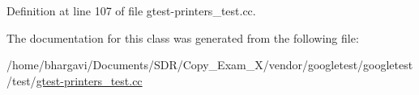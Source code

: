 Definition at line 107 of file gtest-\/printers\+\_\+test.\+cc.



The documentation for this class was generated from the following file\+:\begin{DoxyCompactItemize}
\item 
/home/bhargavi/\+Documents/\+S\+D\+R/\+Copy\+\_\+\+Exam\+\_\+X/vendor/googletest/googletest/test/\hyperlink{gtest-printers__test_8cc}{gtest-\/printers\+\_\+test.\+cc}\end{DoxyCompactItemize}
